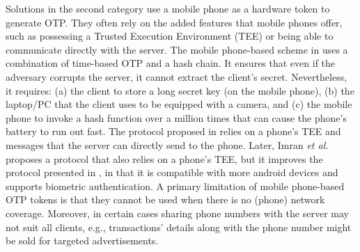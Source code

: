 Solutions in the second category use a mobile phone as a hardware token to generate OTP. They often rely on the added features that mobile phones offer, such as possessing a Trusted Execution Environment (TEE) or being able to communicate directly with the server. The mobile phone-based scheme in  \cite{KoganMB17} uses a combination of time-based OTP and a hash chain. It ensures that even if the adversary corrupts the server, it cannot extract the client's secret. Nevertheless, it requires: (a) the client to store a long secret key (on the mobile phone), (b)  the laptop/PC that the client uses to be equipped with a camera, and (c)  the mobile phone to invoke a hash function over a million times that can cause the phone's battery to run out fast. The protocol proposed in \cite{KonothFFARB20} relies on a phone's TEE  and messages that the server can directly send to the phone. Later,  Imran \textit{et al.} \cite{SARA22} proposes a protocol that also relies on a phone's TEE, but it improves the protocol presented in \cite{KonothFFARB20}, in that it is compatible with more android devices and supports biometric authentication.  A primary limitation of mobile phone-based OTP tokens is that they cannot be used when there is no (phone) network coverage. Moreover, in certain cases sharing phone numbers with the server may not suit all clients, e.g., transactions' details along with the phone number might be sold for targeted advertisements. 
%





%







